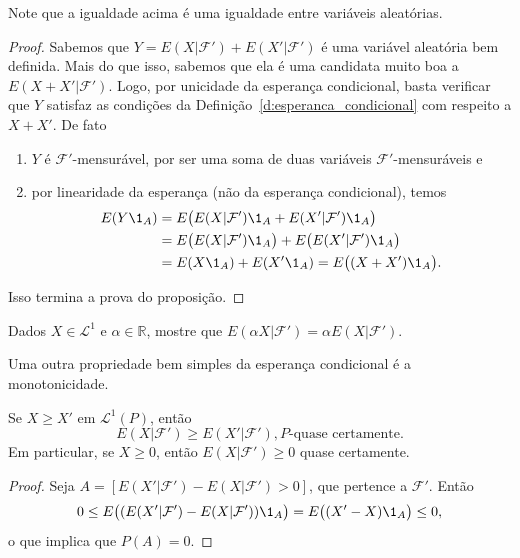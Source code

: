 Note que a igualdade acima é uma igualdade entre variáveis aleatórias.

\begin{proof}
  Sabemos que $Y = E(X|\mathcal{F}') + E(X'|\mathcal{F}')$ é uma variável aleatória bem definida.
  Mais do que isso, sabemos que ela é uma candidata muito boa a $E(X + X'|\mathcal{F}')$.
  Logo, por unicidade da esperança condicional, basta verificar que $Y$ satisfaz as condições da Definição~\ref{d:esperanca_condicional} com respeito a $X + X'$.
  De fato
  \begin{enumerate}[\quad a)]
  \item $Y$ é $\mathcal{F}'$-mensurável, por ser uma soma de duas variáveis $\mathcal{F}'$-mensuráveis e
  \item por linearidade da esperança (não da esperança condicional), temos
    \begin{equation}
      \begin{split}
        E(Y \1_A) & = E\big( E(X|\mathcal{F}')\1_A + E(X'|\mathcal{F}')\1_A \big)\\
        & = E\big( E(X|\mathcal{F}')\1_A\big) + E\big(E(X'|\mathcal{F}')\1_A \big)\\
        & = E(X \1_A) + E(X' \1_A) = E\big( (X + X') \1_A \big).
      \end{split}
    \end{equation}
  \end{enumerate}
  Isso termina a prova do proposição.
\end{proof}

\begin{exercise}
  Dados $X \in \mathcal{L}^1$ e $\alpha \in \mathbb{R}$, mostre que $E(\alpha X|\mathcal{F}') = \alpha E(X|\mathcal{F}')$.
\end{exercise}

Uma outra propriedade bem simples da esperança condicional é a monotonicidade.

\begin{lemma}
  \label{l:ec_mono}
  Se $X \geq X'$ em $\mathcal{L}^1(P)$, então
  \begin{equation}
    E(X|\mathcal{F}') \geq E(X'|\mathcal{F}'), \text{$P$-quase certamente.}
  \end{equation}
  Em particular, se $X \geq 0$, então $E(X|\mathcal{F}') \geq 0$ quase certamente.
\end{lemma}

\begin{proof}
  Seja $A = [E(X'|\mathcal{F}') - E(X|\mathcal{F}') > 0]$, que pertence a $\mathcal{F}'$.
  Então
  \begin{equation}
    0 \leq E\big( (E(X'|\mathcal{F}') - E(X|\mathcal{F}')) \1_A \big) = E\big((X' - X) \1_A\big) \leq 0,
  \end{equation}
  o que implica que $P(A) = 0$.
\end{proof}

